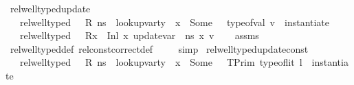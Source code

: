 \begin{isabellebody}
\ rel{\isacharunderscore}{\kern0pt}well{\isacharunderscore}{\kern0pt}typed{\isacharunderscore}{\kern0pt}update{\isacharcolon}{\kern0pt}\ \isanewline
\ \ \ {\isachardoublequoteopen}rel{\isacharunderscore}{\kern0pt}well{\isacharunderscore}{\kern0pt}typed\ {\isasymLambda}\ {\isasymOmega}\ R\ ns{\isachardoublequoteclose}\ \ {\isachardoublequoteopen}lookup{\isacharunderscore}{\kern0pt}var{\isacharunderscore}{\kern0pt}ty\ {\isasymLambda}\ x\ {\isacharequal}{\kern0pt}\ Some\ {\isasymtau}{\isachardoublequoteclose}\ \ {\isachardoublequoteopen}type{\isacharunderscore}{\kern0pt}of{\isacharunderscore}{\kern0pt}val\ v\ {\isacharequal}{\kern0pt}\ instantiate\ {\isasymOmega}\ {\isasymtau}{\isachardoublequoteclose}\isanewline
\ \ \ {\isachardoublequoteopen}rel{\isacharunderscore}{\kern0pt}well{\isacharunderscore}{\kern0pt}typed\ {\isasymLambda}\ {\isasymOmega}\ {\isacharparenleft}{\kern0pt}R{\isacharparenleft}{\kern0pt}x\ {\isasymmapsto}\ {\isacharparenleft}{\kern0pt}Inl\ x{\isacharprime}{\kern0pt}{\isacharparenright}{\kern0pt}{\isacharparenright}{\kern0pt}{\isacharparenright}{\kern0pt}\ {\isacharparenleft}{\kern0pt}update{\isacharunderscore}{\kern0pt}var\ {\isasymLambda}\ ns\ x\ v{\isacharparenright}{\kern0pt}{\isachardoublequoteclose}\isanewline
%
\isadelimproof
\ \ %
\endisadelimproof
%
\isatagproof
{}\isamarkupfalse%
\ assms\isanewline
\ \ \isamarkupfalse%
\ rel{\isacharunderscore}{\kern0pt}well{\isacharunderscore}{\kern0pt}typed{\isacharunderscore}{\kern0pt}def\ rel{\isacharunderscore}{\kern0pt}const{\isacharunderscore}{\kern0pt}correct{\isacharunderscore}{\kern0pt}def\ \isanewline
\ \ \isamarkupfalse%
\ simp%
\endisatagproof
{\isafoldproof}%
%
\isadelimproof
\isanewline
%
\endisadelimproof
\isanewline
{}\isamarkupfalse%
\ rel{\isacharunderscore}{\kern0pt}well{\isacharunderscore}{\kern0pt}typed{\isacharunderscore}{\kern0pt}update{\isacharunderscore}{\kern0pt}const{\isacharcolon}{\kern0pt}\isanewline
\ \ \ {\isachardoublequoteopen}rel{\isacharunderscore}{\kern0pt}well{\isacharunderscore}{\kern0pt}typed\ {\isasymLambda}\ {\isasymOmega}\ R\ ns{\isachardoublequoteclose}\ \ {\isachardoublequoteopen}lookup{\isacharunderscore}{\kern0pt}var{\isacharunderscore}{\kern0pt}ty\ {\isasymLambda}\ x\ {\isacharequal}{\kern0pt}\ Some\ {\isasymtau}{\isachardoublequoteclose}\ \ {\isachardoublequoteopen}TPrim\ {\isacharparenleft}{\kern0pt}type{\isacharunderscore}{\kern0pt}of{\isacharunderscore}{\kern0pt}lit\ l{\isacharparenright}{\kern0pt}\ {\isacharequal}{\kern0pt}\ instantiate\ {\isasymOmega}\ {\isasymtau}{\isachardoublequoteclose}\isanewline

\end{isabellebody}
